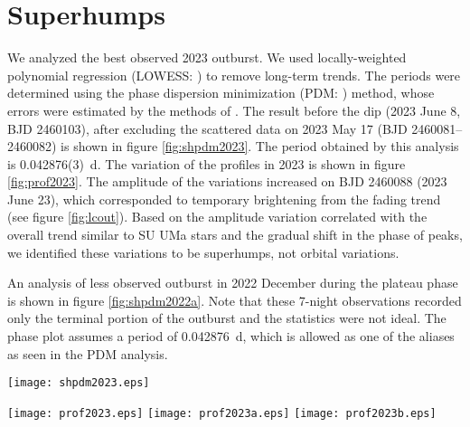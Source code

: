 \documentclass{article}
\def\cite{\citealt}
\begin{document}
\section{Superhumps}

   We analyzed the best observed 2023 outburst.
We used locally-weighted polynomial regression (LOWESS: \cite{LOWESS})
to remove long-term trends.
The periods were determined using the phase dispersion
minimization (PDM: \cite{PDM}) method, whose errors were
estimated by the methods of \citet{fer89error,Pdot2}.
The result before the dip (2023 June 8, BJD 2460103), after
excluding the scattered data on 2023 May 17 (BJD 2460081--2460082)
is shown in figure \ref{fig:shpdm2023}.  The period obtained
by this analysis is 0.042876(3)~d.  The variation of the profiles
in 2023 is shown in figure \ref{fig:prof2023}.
The amplitude of the variations increased on BJD 2460088
(2023 June 23), which corresponded to temporary brightening
from the fading trend (see figure \ref{fig:lcout}).
Based on the amplitude variation correlated with the overall
trend similar to SU UMa stars \citep{Pdot} and the gradual
shift in the phase of peaks, we identified these variations
to be superhumps, not orbital variations.

   An analysis of less observed outburst in 2022 December
during the plateau phase is shown in figure \ref{fig:shpdm2022a}.
Note that these 7-night observations recorded only
the terminal portion of the outburst and the statistics
were not ideal.  The phase plot assumes a period of
0.042876~d, which is allowed as one of the aliases as
seen in the PDM analysis.

\begin{figure*}
\begin{center}
\texttt{[image: shpdm2023.eps]}
\caption{
   Superhumps of ASASSN-22ak in 2023.
   (Upper): PDM analysis.  The bootstrap result using
   randomly contain 50\% of observations is shown as
   a form of 90\% confidence intervals in the resultant 
   $\theta$ statistics.
   (Lower): Phase plot.
}
\label{fig:shpdm2023}
\end{center}
\end{figure*}

\begin{figure*}
\begin{center}
\texttt{[image: prof2023.eps]}
\texttt{[image: prof2023a.eps]}
\texttt{[image: prof2023b.eps]}
\caption{
   Variation of the superhump profile in 2023.
   Superhumps of ASASSN-22ak in 2023.  The epoch is arbitrarily
   assumed to be BJD 2460089.800 and the period of 0.042876~d
   is used.
}
\label{fig:prof2023}
\end{center}
\end{figure*}
\end{document}
